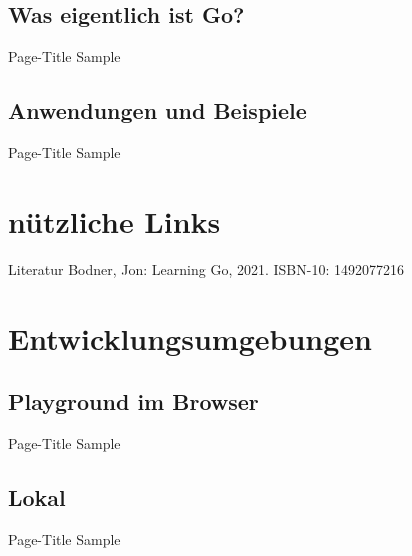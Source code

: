 \subsection{Was eigentlich ist Go?}
\begin{frame}{Page-Title}
	Sample
\end{frame}


\subsection{Anwendungen und Beispiele}
\begin{frame}{Page-Title}
	Sample
\end{frame}



\section{nützliche Links}

\begin{frame}{Literatur}
	Bodner, Jon: Learning Go, 2021. ISBN-10: 1492077216
\end{frame}




\section{Entwicklungsumgebungen}


\subsection{Playground im Browser}
\begin{frame}{Page-Title}
	Sample
\end{frame}

\subsection{Lokal}
\begin{frame}{Page-Title}
	Sample
\end{frame}


